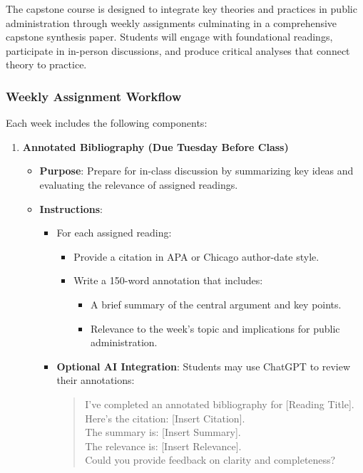 \documentclass[12pt, letterpaper]{article}
\begin{document}
The capstone course is designed to integrate key theories and practices in public administration through weekly assignments culminating in a comprehensive capstone synthesis paper. Students will engage with foundational readings, participate in in-person discussions, and produce critical analyses that connect theory to practice.

\subsubsection*{Weekly Assignment Workflow}

Each week includes the following components:

\begin{enumerate}
    \item \textbf{Annotated Bibliography (Due Tuesday Before Class)}
    \begin{itemize}
        \item \textbf{Purpose}: Prepare for in-class discussion by summarizing key ideas and evaluating the relevance of assigned readings.
        \item \textbf{Instructions}:
        \begin{itemize}
            \item For each assigned reading:
            \begin{itemize}
                \item Provide a citation in APA or Chicago author-date style.
                \item Write a 150-word annotation that includes:
                \begin{itemize}
                    \item A brief summary of the central argument and key points.
                    \item Relevance to the week’s topic and implications for public administration.
                \end{itemize}
            \end{itemize}
            \item \textbf{Optional AI Integration}: Students may use ChatGPT to review their annotations:
            \begin{quote}
                I’ve completed an annotated bibliography for [Reading Title]. Here’s the citation: [Insert Citation]. \\ 
                The summary is: [Insert Summary]. \\ 
                The relevance is: [Insert Relevance]. \\ 
                Could you provide feedback on clarity and completeness?
            \end{quote}
        \end{itemize}
    \end{itemize}


\end{enumerate}
\end{document}
